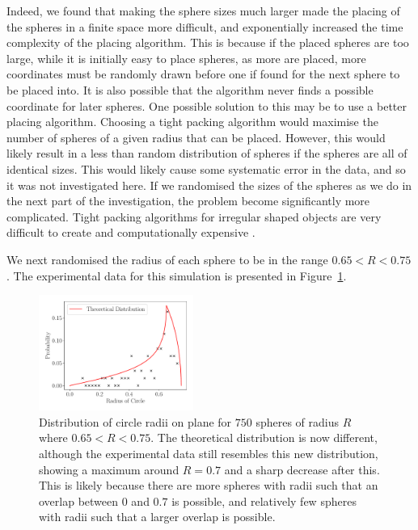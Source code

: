 \documentclass[journal]{IEEEtran}
\begin{document}
Indeed, we found that making the sphere sizes much larger made the placing of
the spheres in a finite space more difficult, and exponentially increased the
time complexity of the placing algorithm. This is because if the placed spheres
are too large, while it is initially easy to place spheres, as more are placed,
more coordinates must be randomly drawn before one if found for the next sphere
to be placed into. It is also possible that the algorithm never finds a possible
coordinate for later spheres. One possible solution to this may be to use a
better placing algorithm. Choosing a tight packing algorithm  would
maximise the number of spheres of a given radius that can be placed. However,
this would likely result in a less than random distribution of spheres if the
spheres are all of identical sizes. This would likely cause some systematic
error in the data, and so it was not investigated here. If we randomised the
sizes of the spheres as we do in the next part of the investigation, the problem
become significantly more complicated. Tight packing algorithms for irregular
shaped objects are very difficult to create and computationally expensive
.

We next randomised the radius of each sphere to be in the range $0.65 < R <
0.75$. The experimental data for this simulation is presented in
Figure~\ref{fig:random}.

\begin{figure}%
\begin{center}
\includegraphics[width=0.45\textwidth]{./../Figures/750_07_random.pdf}
\caption{Distribution of circle radii on plane for $750$ spheres of radius $R$
  where $0.65 < R < 0.75$. The theoretical distribution is now different,
  although the experimental data still resembles this new distribution, showing
  a maximum around $R = 0.7$ and a sharp decrease after this. This is likely
  because there are more spheres with radii such that an overlap between $0$ and
  $0.7$ is possible, and relatively few spheres with radii such that a larger
  overlap is possible.}
\label{fig:random}
\end{center}
\end{figure}
\end{document}
